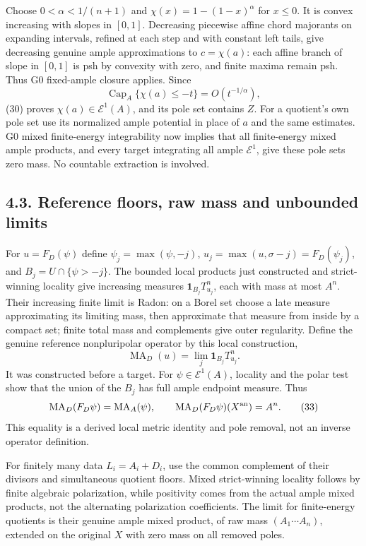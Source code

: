 \documentclass[
  10pt,
]{article}
\begin{document}
Choose \(0<\alpha<1/(n+1)\) and \(\chi(x)=1-(1-x)^\alpha\) for
\(x\leq0\). It is convex increasing with slopes in \([0,1]\). Decreasing
piecewise affine chord majorants on expanding intervals, refined at each
step and with constant left tails, give decreasing genuine ample
approximations to \(c=\chi(a)\): each affine branch of slope in
\([0,1]\) is psh by convexity with zero, and finite maxima remain psh.
Thus G0 fixed-ample closure applies. Since
\[\operatorname{Cap}_A\{\chi(a)\leq-t\}=O(t^{-1/\alpha}),\tag{31}\] (30)
proves \(\chi(a)\in\mathcal E^1(A)\), and its pole set contains \(Z\).
For a quotient's own pole set use its normalized ample potential in
place of \(a\) and the same estimates. G0 mixed finite-energy
integrability now implies that all finite-energy mixed ample products,
and every target integrating all ample \(\mathcal E^1\), give these pole
sets zero mass. No countable extraction is involved.

\subsection{4.3. Reference floors, raw mass and unbounded
limits}\label{reference-floors-raw-mass-and-unbounded-limits}

For \(u=F_D(\psi)\) define \(\psi_j=\max(\psi,-j)\),
\(u_j=\max(u,\sigma-j)=F_D(\psi_j)\), and \(B_j=U\cap\{\psi>-j\}\). The
bounded local products just constructed and strict-winning locality give
increasing measures \(\mathbf1_{B_j}T_{u_j}^n\), each with mass at most
\(A^n\). Their increasing finite limit is Radon: on a Borel set choose a
late measure approximating its limiting mass, then approximate that
measure from inside by a compact set; finite total mass and complements
give outer regularity. Define the genuine reference nonpluripolar
operator by this local construction,
\[\operatorname{MA}_D(u)=\lim_j\mathbf1_{B_j}T_{u_j}^n.\tag{32}\] It was
constructed before a target. For \(\psi\in\mathcal E^1(A)\), locality
and the polar test show that the union of the \(B_j\) has full ample
endpoint measure. Thus
\[\operatorname{MA}_D(F_D\psi)=\operatorname{MA}_A(\psi),
\qquad\operatorname{MA}_D(F_D\psi)(X^{\rm an})=A^n.\tag{33}\] This
equality is a derived local metric identity and pole removal, not an
inverse operator definition.

For finitely many data \(L_i=A_i+D_i\), use the common complement of
their divisors and simultaneous quotient floors. Mixed strict-winning
locality follows by finite algebraic polarization, while positivity
comes from the actual ample mixed products, not the alternating
polarization coefficients. The limit for finite-energy quotients is
their genuine ample mixed product, of raw mass \((A_1\cdots A_n)\),
extended on the original \(X\) with zero mass on all removed poles.
\end{document}
